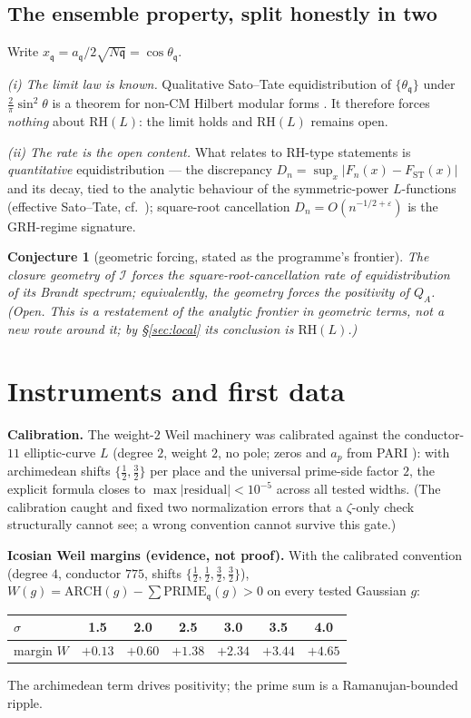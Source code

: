 \documentclass[11pt]{article}
\newtheorem{conjecture}[theorem]{Conjecture}
\theoremstyle{remark}
\newcommand{\II}{\mathcal{I}}
\newcommand{\RH}{\mathrm{RH}}
\newcommand{\stcdf}{F_{\mathrm{ST}}}
\begin{document}
\subsection{The ensemble property, split honestly in two}
Write $x_{\mathfrak q} = a_{\mathfrak q} / 2\sqrt{N\mathfrak q} = \cos\theta_{\mathfrak q}$.

\emph{(i) The limit law is known.} Qualitative Sato--Tate equidistribution of
$\{\theta_{\mathfrak q}\}$ under $\tfrac{2}{\pi}\sin^2\theta$ is a theorem for non-CM
Hilbert modular forms \cite{BLGHT}. It therefore forces \emph{nothing} about
$\RH(L)$: the limit holds and $\RH(L)$ remains open.

\emph{(ii) The rate is the open content.} What relates to $\RH$-type statements is
\emph{quantitative} equidistribution --- the discrepancy
$D_n = \sup_x |F_n(x) - \stcdf(x)|$ and its decay, tied to the analytic behaviour
of the symmetric-power $L$-functions (effective Sato--Tate, cf.~\cite{MurtySinha});
square-root cancellation $D_n = O(n^{-1/2+\varepsilon})$ is the GRH-regime signature.

\begin{conjecture}[geometric forcing, stated as the programme's frontier]
\label{conj:force}
The closure geometry of $\II$ forces the square-root-cancellation rate of
equidistribution of its Brandt spectrum; equivalently, the geometry forces the
positivity of $Q_A$. \emph{(Open. This is a restatement of the analytic frontier in
geometric terms, not a new route around it; by \S\ref{sec:local} its conclusion is
$\RH(L)$.)}
\end{conjecture}

\section{Instruments and first data}\label{sec:inst}

\textbf{Calibration.} The weight-$2$ Weil machinery was calibrated against the
conductor-$11$ elliptic-curve $L$ (degree $2$, weight $2$, no pole; zeros and $a_p$
from PARI \cite{PARI}): with archimedean shifts $\{\tfrac12,\tfrac32\}$ per place and
the universal prime-side factor $2$, the explicit formula closes to
$\max|\text{residual}| < 10^{-5}$ across all tested widths. (The calibration caught
and fixed two normalization errors that a $\zeta$-only check structurally cannot see;
a wrong convention cannot survive this gate.)

\textbf{Icosian Weil margins (evidence, not proof).} With the calibrated convention
(degree $4$, conductor $775$, shifts $\{\tfrac12,\tfrac12,\tfrac32,\tfrac32\}$),
$W(g) = \mathrm{ARCH}(g) - \sum \mathrm{PRIME}_{\mathfrak q}(g) > 0$ on every tested
Gaussian $g$:
\begin{center}
\begin{tabular}{lcccccc}
\toprule
$\sigma$ & 1.5 & 2.0 & 2.5 & 3.0 & 3.5 & 4.0\\
\midrule
margin $W$ & $+0.13$ & $+0.60$ & $+1.38$ & $+2.34$ & $+3.44$ & $+4.65$\\
\bottomrule
\end{tabular}
\end{center}
The archimedean term drives positivity; the prime sum is a Ramanujan-bounded ripple.
\end{document}
